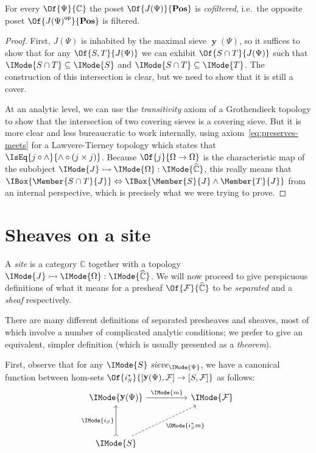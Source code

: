\documentclass{article}
\newcommand\Posets{\mathbf{Pos}}
\newcommand\OpCat[1]{{{#1}^{\mathsf{op}}}}
\DeclareMathOperator\OpYoneda{\mathbf{y}}
\newcommand\Yoneda[1]{\OpYoneda({#1})}
\newcommand\Psh[1]{\widehat{#1}}
\newcommand\IsSubobject[3]{\IMode{#1}\rightarrowtail\IMode{#2}:\IMode{#3}}
\newcommand\IsSubsetEq[2]{\IMode{#1}\subseteq\IMode{#2}}
\newcommand\IsSieve[2]{\IMode{#2}\ \mathit{sieve}_{\IMode{#1}}}
\begin{document}
\begin{lem}\label{lem:covering-sieves-filtered}
  For every $\Of{\Psi}{\mathbb{C}}$ the poset $\Of{J(\Psi)}{\Posets}$
  is \emph{cofiltered}, i.e.\ the opposite poset
  $\Of{\OpCat{J(\Psi)}}{\Posets}$ is filtered.
\end{lem}
\begin{proof}
  First, $J(\Psi)$ is inhabited by the maximal sieve $\Yoneda{\Psi}$,
  so it suffices to show that for any $\Of{S,T}{J(\Psi)}$ we can
  exhibit $\Of{S\cap T}{J(\Psi)}$ such that $\IsSubsetEq{S\cap T}{S}$
  and $\IsSubsetEq{S\cap T}{T}$. The construction of this intersection
  is clear, but we need to show that it is still a cover.

  At an analytic level, we can use the \emph{transitivity} axiom of a
  Grothendieck topology to show that the intersection of two covering
  sieves is a covering sieve. But it is more clear and less
  bureaucratic to work internally, using
  axiom~\ref{eq:preserves-meets} for a Lawvere-Tierney topology which
  states that $\IsEq{j\circ\land}{\land\circ(j\times j)}$.
%
  Because $\Of{j}{\Omega\to\Omega}$ is the characteristic map of the
  subobject $\IsSubobject{J}{\Omega}{\Psh{\mathbb{C}}}$, this really
  means that
  $\IBox{\Member{S\cap
      T}{J}}\Leftrightarrow\IBox{\Member{S}{J}\land\Member{T}{J}}$
  from an internal perspective, which is precisely what we were trying
  to prove.
\end{proof}

\section{Sheaves on a site}

A \emph{site} is a category $\mathbb{C}$ together with a topology
$\IsSubobject{J}{\Omega}{\Psh{\mathbb{C}}}$. We will now
proceed to give perspicuous definitions of what it means for a
presheaf $\Of{\mathcal{F}}{\Psh{\mathbb{C}}}$ to be \emph{separated} and a
\emph{sheaf} respectively.

There are many different definitions of separated presheaves and
sheaves, most of which involve a number of complicated analytic
conditions; we prefer to give an equivalent, simpler definition (which
is usually presented as a \emph{theorem}).

First, observe that for any $\IsSieve{\Psi}{S}$, we have a canonical
function between hom-sets
$\Of{i_S^*}{[\Yoneda{\Psi},\mathcal{F}]\to [S,\mathcal{F}]}$
as follows:
\[
  \begin{tikzcd}[sep=huge]
    \IMode{\Yoneda{\Psi}}
    \arrow[r, "\IMode{m}"]
    &
    \IMode{\mathcal{F}}
    \\
    \IMode{S}
    \arrow[u,rightarrowtail,"\IMode{i_S}"]
    \arrow[ur,swap,dashed,"\OMode{i_S^*m}"]
  \end{tikzcd}
\]
\end{document}
